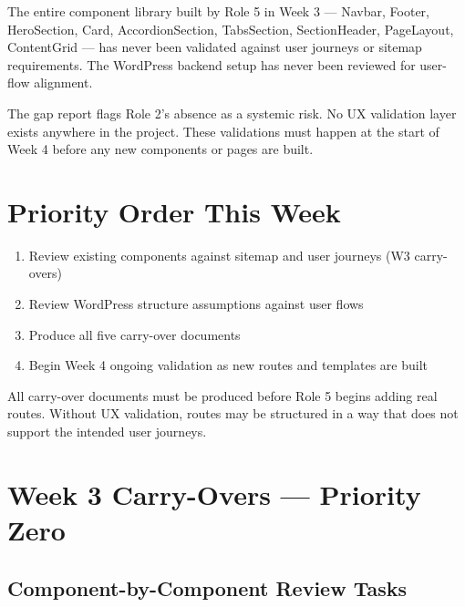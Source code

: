\documentclass[12pt,a4paper]{article}
\begin{document}
The entire component library built by Role 5 in Week 3 --- Navbar, Footer, HeroSection,
Card, AccordionSection, TabsSection, SectionHeader, PageLayout, ContentGrid --- has never
been validated against user journeys or sitemap requirements. The WordPress backend setup
has never been reviewed for user-flow alignment.

\begin{darkbox}
The gap report flags Role 2's absence as a systemic risk. No UX validation layer exists
anywhere in the project. These validations must happen at the start of Week 4 before any
new components or pages are built.
\end{darkbox}

\section{Priority Order This Week}

\begin{enumerate}
    \item Review existing components against sitemap and user journeys (W3 carry-overs)
    \item Review WordPress structure assumptions against user flows
    \item Produce all five carry-over documents
    \item Begin Week 4 ongoing validation as new routes and templates are built
\end{enumerate}

\begin{bluebox}
All carry-over documents must be produced before Role 5 begins adding real routes.
Without UX validation, routes may be structured in a way that does not support the
intended user journeys.
\end{bluebox}

\section{Week 3 Carry-Overs --- Priority Zero}

\subsection{Component-by-Component Review Tasks}
\end{document}
